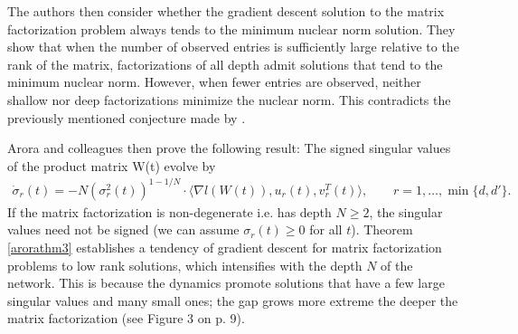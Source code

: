 \documentclass{article}
\newenvironment{manualtheorem}[1]{%
  \renewcommand\themanualtheoreminner{#1}%
  \manualtheoreminner
}{\endmanualtheoreminner}
\begin{document}
The authors then consider whether the gradient descent solution to the matrix factorization problem always tends to the minimum nuclear norm solution. They show that when the number of observed entries is sufficiently large relative to the rank of the matrix, factorizations of all depth admit solutions that tend to the minimum nuclear norm. However, when fewer entries are observed, neither shallow nor deep factorizations minimize the nuclear norm. This contradicts the previously mentioned conjecture made by \cite{gunasekar2018implicit}.

Arora and colleagues then prove the following result:
\begin{manualtheorem}{3}\label{arorathm3}
The signed singular values of the product matrix W(t) evolve by 
\begin{align*}
    \dot{\sigma}_r(t) = -N (\sigma_r^2(t))^{1-1/N} \cdot \langle \nabla l(W(t)), u_r(t), v_r^T(t) \rangle, \qquad r = 1, \ldots, \min\{d, d'\}.
\end{align*}
If the matrix factorization is non-degenerate i.e. has depth $N \geq 2$, the singular values need not be signed (we can assume $\sigma_r(t) \geq 0$ for all $t$).
\end{manualtheorem}
Theorem \ref{arorathm3} establishes a tendency of gradient descent for matrix factorization problems to low rank solutions, which intensifies with the depth $N$ of the network. This is because the dynamics promote solutions that have a few large singular values and many small ones; the gap grows more extreme the deeper the matrix factorization (see Figure 3 on p. 9).



\end{document}
